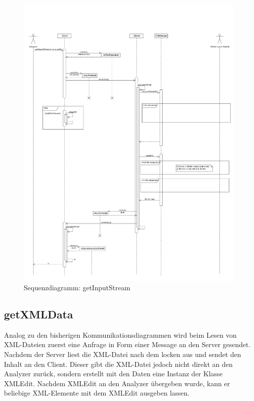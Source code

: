 \begin{figure}[H]
	\centering
	\label{dia:design:frontend:sqc:getInputStream}
	\includegraphics[width=\textwidth]{design/frontend/sequence/get-input-stream-sequence.pdf}
	\caption{Sequenzdiagramm: getInputStream}
\end{figure}




\subsection {getXMLData}


Analog zu den bisherigen Kommunikationsdiagrammen wird beim Lesen von XML-Dateien zuerst eine Anfrage in Form einer Message an den Server gesendet.
Nachdem der Server liest die XML-Datei nach dem locken aus und sendet den Inhalt an den Client.
Dieser gibt die XML-Datei jedoch nicht direkt an den Analyzer zurück, sondern erstellt mit den Daten eine Instanz der Klasse XMLEdit.
Nachdem XMLEdit an den Analyzer übergeben wurde, kann er beliebige XML-Elemente mit dem XMLEdit ausgeben lassen.

